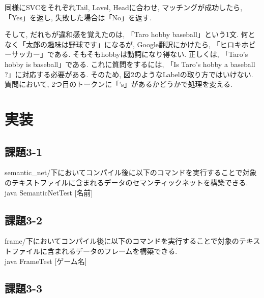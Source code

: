 ﻿\documentclass[uplatex,12pt]{jsarticle}
\begin{document}
 同様にSVCをそれぞれTail, Lavel, Headに合わせ, マッチングが成功したら, 「Yes」を返し, 失敗した場合は「No」を返す.

そして, だれもが違和感を覚えたのは, 「Taro hobby baseball」という1文. 何となく「太郎の趣味は野球です」になるが, Google翻訳にかけたら, 「ヒロキホビーサッカー」である. そもそもhobbyは動詞になり得ない. 正しくは, 「Taro's hobby is baseball」である. これに質問をするには, 「Is Taro's hobby a baseball ?」に対応する必要がある. そのため, 図2のようなLabelの取り方ではいけない. 質問において, 2つ目のトークンに「's」があるかどうかで処理を変える.

\section{実装}
\subsection{課題3-1}
semantic\_net/下においてコンパイル後に以下のコマンドを実行することで対象のテキストファイルに含まれるデータのセマンティックネットを構築できる. \\
java SemanticNetTest [名前] 
\subsection{課題3-2}
frame/下においてコンパイル後に以下のコマンドを実行することで対象のテキストファイルに含まれるデータのフレームを構築できる. \\
java FrameTest [ゲーム名] 

\subsection{課題3-3}
\end{document}
